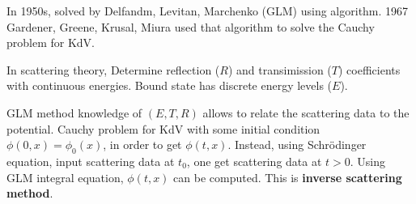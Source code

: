 In 1950s, solved by Delfandm, Levitan, Marchenko (GLM) using algorithm. 1967 Gardener, Greene, Krusal, Miura used that algorithm to solve the Cauchy problem for KdV.

In scattering theory, Determine reflection ($R$) and transimission ($T$) coefficients with continuous energies. Bound state has discrete energy levels ($E$).

GLM method knowledge of $(E, T, R)$ allows to relate the scattering data to the potential. Cauchy problem for KdV with some initial condition $\phi(0, x) = \phi_0 (x)$, in order to get $\phi(t, x)$. Instead, using Schrödinger equation, input scattering data at $t_0$, one get scattering data at $t > 0$. Using GLM integral equation, $\phi(t, x)$ can be computed. This is \textbf{inverse scattering method}.
